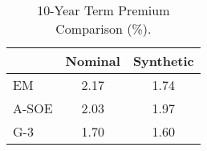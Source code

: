 \begin{tiny}\begin{table}\centering\begin{tabular}{l|cc}\toprule & Nominal & Synthetic \\\midrule EM & 2.17 & 1.74 \\A-SOE & 2.03 & 1.97 \\G-3 & 1.70 & 1.60 \\\bottomrule\end{tabular}\caption{10-Year Term Premium Comparison (\%).}\label{tab:tp_compare10yr}\end{table}\end{tiny}